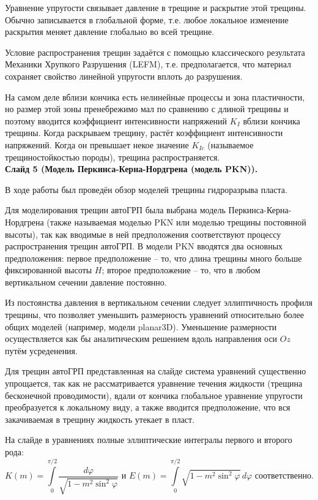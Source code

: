 \documentclass[a4paper, 12pt]{article}
\begin{document}
Уравнение упругости связывает давление в трещине и раскрытие этой трещины.
Обычно записывается в глобальной форме, т.е. любое локальное изменение раскрытия меняет давление глобально во всей трещине.

Условие распространения трещин задаётся с помощью классического результата Механики Хрупкого Разрушения (LEFM), т.е. предполагается, что материал сохраняет свойство линейной упругости вплоть до разрушения.

На самом деле вблизи кончика есть нелинейные процессы и зона пластичности, но размер этой зоны пренебрежимо мал по сравнению с длиной трещины и поэтому вводится коэффициент интенсивности напряжений $K_I$ вблизи кончика трещины.
Когда раскрываем трещину, растёт коэффициент интенсивности напряжений.
Когда он превышает некое значение $K_{Ic}$ (называемое трещиностойкостью породы), трещина распространяется.
\\


\textbf{Слайд 5 (Модель Перкинса-Керна-Нордгрена (модель PKN)).}

В ходе работы был проведён обзор моделей трещины гидроразрыва пласта.

Для моделирования трещин автоГРП была выбрана модель Перкинса-Керна-Нордгрена (также называемая моделью PKN или моделью трещины постоянной высоты), так как вводимые в ней предположения соответствуют процессу распространения трещин автоГРП.
В модели PKN вводятся два основных предположения: первое предположение -- то, что длина трещины много больше фиксированной высоты $H$; второе предположение -- то, что в любом вертикальном сечении давление постоянно.

Из постоянства давления в вертикальном сечении следует эллиптичность профиля трещины, что позволяет уменьшить размерность уравнений относительно более общих моделей (например, модели planar3D).
Уменьшение размерности осуществляется как бы аналитическим решением вдоль направления оси $Oz$ путём усреденения.

Для трещин автоГРП представленная на слайде система уравнений существенно упрощается, так как не рассматривается уравнение течения жидкости (трещина бесконечной проводимости), вдали от кончика глобальное уравнение упругости преобразуется к локальному виду, а также вводится предположение, что вся закачиваемая в трещину жидкость утекает в пласт.

На слайде в уравнениях полные эллиптические интегралы первого и второго рода:
$$K(m)=\int\limits_{0}^{\pi/2}{\frac{d\varphi}{\sqrt{1-m^2\sin^2{\!\varphi}}}}\text{ и } E(m)=\int\limits_{0}^{\pi/2}{\sqrt{1-m^2\sin^2{\!\varphi}}\,d\varphi}\text{ соответственно.}$$
\\
\end{document}
